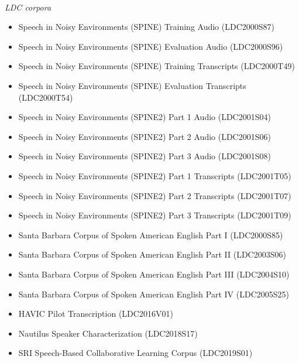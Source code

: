 \documentclass{article}
\begin{document}
\begin{appendices}
\vspace{0.5cm}
 \\
{\it LDC corpora}
\begin{itemize}
    \item Speech in Noisy Environments (SPINE) Training Audio (LDC2000S87)
    \item Speech in Noisy Environments (SPINE) Evaluation Audio (LDC2000S96)
    \item Speech in Noisy Environments (SPINE) Training Transcripts (LDC2000T49)
    \item Speech in Noisy Environments (SPINE) Evaluation Transcripts (LDC2000T54)
    \item Speech in Noisy Environments (SPINE2) Part 1 Audio (LDC2001S04)
    \item Speech in Noisy Environments (SPINE2) Part 2 Audio (LDC2001S06)
    \item Speech in Noisy Environments (SPINE2) Part 3 Audio (LDC2001S08)
    \item Speech in Noisy Environments (SPINE2) Part 1 Transcripts (LDC2001T05)
    \item Speech in Noisy Environments (SPINE2) Part 2 Transcripts (LDC2001T07)
    \item Speech in Noisy Environments (SPINE2) Part 3 Transcripts (LDC2001T09)
	\item Santa Barbara Corpus of Spoken American English Part I (LDC2000S85)
    \item Santa Barbara Corpus of Spoken American English Part II (LDC2003S06)
    \item Santa Barbara Corpus of Spoken American English Part III (LDC2004S10)
    \item Santa Barbara Corpus of Spoken American English Part IV (LDC2005S25)
    \item HAVIC Pilot Transcription (LDC2016V01)
    \item Nautilus Speaker Characterization (LDC2018S17)
    \item SRI Speech-Based Collaborative Learning Corpus (LDC2019S01)
\end{itemize}


\end{appendices}
\end{document}
